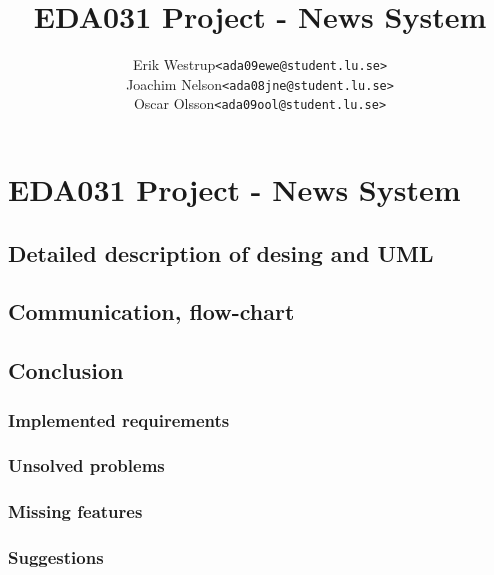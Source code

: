 \documentclass[10pt, a4paper]{article}
\title{EDA031 Project - News System}
\author{
	\begin{tabular}{l l}
		Erik Westrup & \texttt{<ada09ewe@student.lu.se>}\\
		Joachim Nelson & \texttt{<ada08jne@student.lu.se>} \\ %
		Oscar Olsson & \texttt{<ada09ool@student.lu.se>}
	\end{tabular}
}
\begin{document}
\begin{titlepage}
\maketitle
\thispagestyle{empty}	%
\end{titlepage}

\section{EDA031 Project - News System}

\subsection{Detailed description of desing and UML}

\subsection{Communication, flow-chart}

\subsection{Conclusion}

\subsubsection{Implemented requirements}

\subsubsection{Unsolved problems}

\subsubsection{Missing features}

\subsubsection{Suggestions}

\emph{\cite{dummy+ref}} 
\newpage


\end{document}
